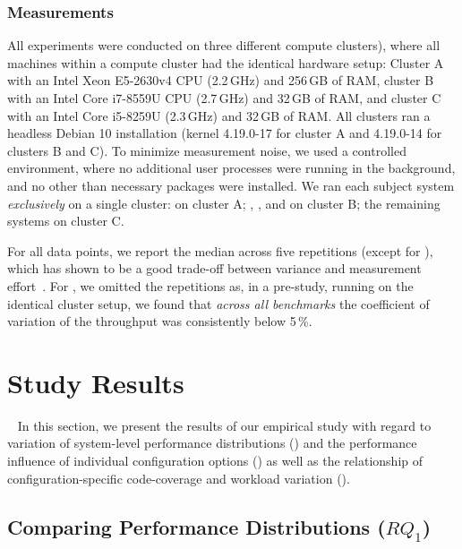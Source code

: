 {\subsubsection{Measurements}\label{sec:measurement_setup}
All experiments were conducted on three different compute clusters), where all machines within a compute cluster had the identical hardware setup: Cluster \textsf{A} with an Intel Xeon E5-2630v4 CPU (2.2\,GHz) and 256\,GB of RAM, cluster \textsf{B}  with an Intel Core i7-8559U CPU (2.7\,GHz) and 32\,GB of RAM, and cluster \textsf{C} with an Intel Core i5-8259U (2.3\,GHz) and 32\,GB of RAM. All clusters ran a headless Debian 10 installation (kernel 4.19.0-17 for cluster \textsf{A} and 4.19.0-14 for clusters \textsf{B} and \textsf{C}). To minimize measurement noise, we used a controlled environment, where no additional user processes were running in the background, and no other than necessary packages were installed. 
We ran each subject system \textit{exclusively} on a single cluster: \htwo on cluster \textsf{A}; \dconvert, \batik, and \jadx on cluster \textsf{B}; the remaining systems on cluster \textsf{C}.

For all data points, we report the median across five repetitions (except for \htwo), which has shown to be a good trade-off between variance and measurement effort~\cite{abcdef}. For \htwo, we omitted the repetitions as, in a pre-study, running on the identical cluster setup, we found that \textit{across all benchmarks} the coefficient of variation of the throughput was consistently below 5\,\%.

\section{Study Results}~\label{sec:results}
In this section, we present the results of our empirical study with regard to variation of system-level performance distributions () and the performance influence of individual configuration options () as well as the relationship of configuration-specific code-coverage and workload variation (). 

\subsection{Comparing Performance Distributions ($RQ_1$)}\label{sec:rq1}
}
